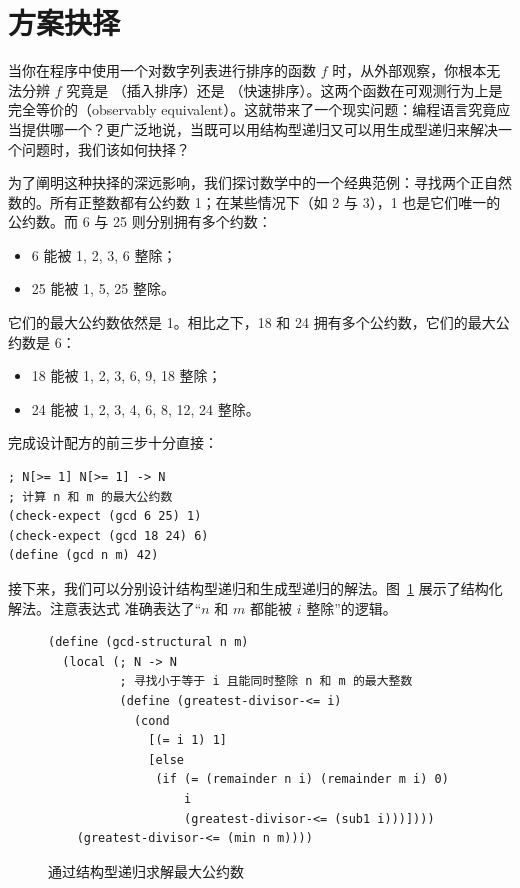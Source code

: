 \section{方案抉择}
\label{sec:26_4}

当你在程序中使用一个对数字列表进行排序的函数 $f$ 时，从外部观察，你根本无法分辨 $f$ 究竟是 （插入排序）还是 （快速排序）。这两个函数在可观测行为上是完全等价的（observably equivalent）。这就带来了一个现实问题：编程语言究竟应当提供哪一个？更广泛地说，当既可以用结构型递归又可以用生成型递归来解决一个问题时，我们该如何抉择？

为了阐明这种抉择的深远影响，我们探讨数学中的一个经典范例：寻找两个正自然数的。所有正整数都有公约数 1；在某些情况下（如 2 与 3），1 也是它们唯一的公约数。而 6 与 25 则分别拥有多个约数：
\begin{itemize}
  \item 6 能被 1, 2, 3, 6 整除；
  \item 25 能被 1, 5, 25 整除。
\end{itemize}
它们的最大公约数依然是 1。相比之下，18 和 24 拥有多个公约数，它们的最大公约数是 6：
\begin{itemize}
  \item 18 能被 1, 2, 3, 6, 9, 18 整除；
  \item 24 能被 1, 2, 3, 4, 6, 8, 12, 24 整除。
\end{itemize}

完成设计配方的前三步十分直接：

\begin{lstlisting}[language=BSL]
; N[>= 1] N[>= 1] -> N
; 计算 n 和 m 的最大公约数
(check-expect (gcd 6 25) 1)
(check-expect (gcd 18 24) 6)
(define (gcd n m) 42)
\end{lstlisting}

接下来，我们可以分别设计结构型递归和生成型递归的解法。图~\ref{fig:gcd-structural} 展示了结构化解法。注意表达式  准确表达了“$n$ 和 $m$ 都能被 $i$ 整除”的逻辑。

\begin{figure}[htbp]
  \centering
\begin{lstlisting}[language=BSL]
(define (gcd-structural n m)
  (local (; N -> N
          ; 寻找小于等于 i 且能同时整除 n 和 m 的最大整数
          (define (greatest-divisor-<= i)
            (cond
              [(= i 1) 1]
              [else
               (if (= (remainder n i) (remainder m i) 0)
                   i
                   (greatest-divisor-<= (sub1 i)))])))
    (greatest-divisor-<= (min n m))))
\end{lstlisting}
  \caption{通过结构型递归求解最大公约数}
  \label{fig:gcd-structural}
\end{figure}

